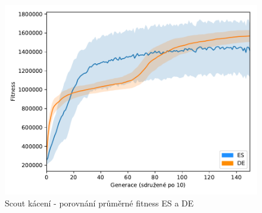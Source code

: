	\begin{figure}[t]\centering
		\includegraphics[width=\columnwidth]{../img/WoodMap/DEvsES/WCuttorCutMem}
		\caption{Scout kácení - porovnání průměrné fitness ES a DE}
		\label{obr04:CutESvsDE}
	\end{figure}
	\clearpage
	
